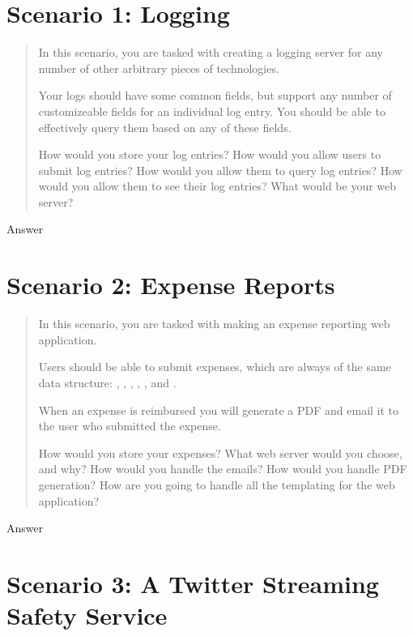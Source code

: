 \documentclass[12pt, letterpaper]{homework}
\author{Bradford Smith}
\title{}
\date{\today}
\begin{document}
\maketitle

\section*{Scenario 1: Logging}

\begin{quote}
    In this scenario, you are tasked with creating a logging server for any number
    of other arbitrary pieces of technologies.

    Your logs should have some common fields, but support any number of
    customizeable fields for an individual log entry. You should be able to
    effectively query them based on any of these fields.

    How would you store your log entries? How would you allow users to submit log
    entries? How would you allow them to query log entries? How would you allow them
    to see their log entries? What would be your web server?
\end{quote}

Answer %

\section*{Scenario 2: Expense Reports}

\begin{quote}
    In this scenario, you are tasked with making an expense reporting web
    application.

    Users should be able to submit expenses, which are always of the same data
    structure: , , , ,
    , and .

    When an expense is reimbursed you will generate a PDF and email it to the user
    who submitted the expense.

    How would you store your expenses? What web server would you choose, and why?
    How would you handle the emails? How would you handle PDF generation? How are
    you going to handle all the templating for the web application?
\end{quote}

Answer %

\section*{Scenario 3: A Twitter Streaming Safety Service}
\end{document}
